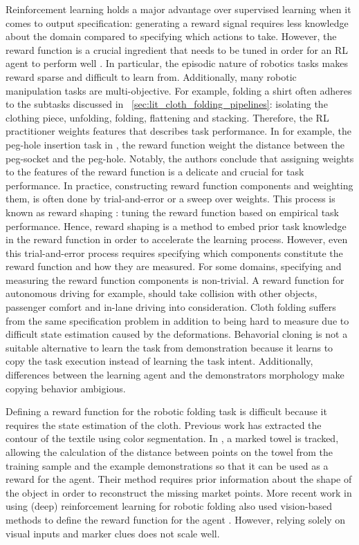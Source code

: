 \documentclass[\home/main.tex]{subfiles}
\begin{document}
Reinforcement learning holds a major advantage over supervised learning when it comes to output specification: generating a reward signal requires less knowledge about the domain compared to specifying which actions to take. However, the reward function is a crucial ingredient that needs to be tuned in order for an RL agent to perform well \autocite{Sutton2018}. In particular, the episodic nature of robotics tasks makes reward sparse and difficult to learn from. Additionally, many robotic manipulation tasks are multi-objective. For example, folding a shirt often adheres to the subtasks discussed in ~\cref{sec:lit_cloth_folding_pipelines}: isolating the clothing piece, unfolding, folding, flattening and stacking. Therefore, the RL practitioner weights features that describes task performance. In for example, the peg-hole insertion task in \autocite{vecerik2018leveraging}, the reward function weight the distance between the peg-socket and the peg-hole. Notably, the authors conclude that assigning weights to the features of the reward function is a delicate and crucial for task performance. In practice, constructing reward function components and weighting them, is often done by trial-and-error or a sweep over weights. This process is known as reward shaping \autocite{laud2004theory}: tuning the reward function based on empirical task performance. Hence, reward shaping is a method to embed prior task knowledge in the reward function in order to accelerate the learning process. However, even this trial-and-error process requires specifying which components constitute the reward function and how they are measured. For some domains, specifying and measuring the reward function components is non-trivial. A reward function for autonomous driving for example, should take collision with other objects, passenger comfort and in-lane driving into consideration. Cloth folding suffers from the same specification problem in addition to being hard to measure due to difficult state estimation caused by the deformations. Behavorial cloning is not a suitable alternative to learn the task from demonstration because it learns to copy the task execution instead of learning the task intent. Additionally, differences between the learning agent and the demonstrators morphology make copying behavior ambigious. 

Defining a reward function for the robotic folding task is difficult because it requires the state estimation of the cloth. Previous work \autocite{Doumanoglou2016,Miller2012} has extracted the contour of the textile using color segmentation. In \autocite{Balaguer2011}, a marked towel is tracked, allowing the calculation of the distance between points on the towel from the training sample and the example demonstrations so that it can be used as a reward for the agent. Their method requires prior information about the shape of the object in order to reconstruct the missing market points. More recent work in using (deep) reinforcement learning for robotic folding also used vision-based methods to define the reward function for the agent \autocite{Tsurumine2019, Matas2018}. However, relying solely on visual inputs and marker clues does not scale well. 
\end{document}
